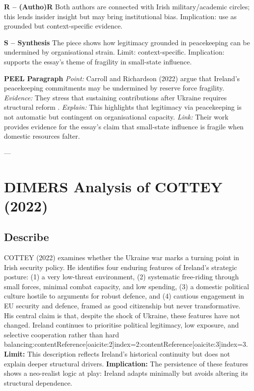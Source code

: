 \textbf{R – (Autho)R}  
Both authors are connected with Irish military/academic circles; this lends insider insight but may bring institutional bias. Implication: use as grounded but context-specific evidence.

\textbf{S – Synthesis}  
The piece shows how legitimacy grounded in peacekeeping can be undermined by organisational strain. Limit: context-specific. Implication: supports the essay’s theme of fragility in small-state influence.

\textbf{PEEL Paragraph}  
\textit{Point:} Carroll and Richardson (2022) argue that Ireland’s peacekeeping commitments may be undermined by reserve force fragility.  
\textit{Evidence:} They stress that sustaining contributions after Ukraine requires structural reform \parencite{CARROLL_RICHARDSON_2022}.  
\textit{Explain:} This highlights that legitimacy via peacekeeping is not automatic but contingent on organisational capacity.  
\textit{Link:} Their work provides evidence for the essay’s claim that small-state influence is fragile when domestic resources falter.  

---
\section*{DIMERS Analysis of COTTEY (2022)}

\subsection*{Describe}
COTTEY (2022) \nocite{COTTEY_2022} examines whether the Ukraine war marks a turning point in Irish security policy. He identifies four enduring features of Ireland’s strategic posture: (1) a very low-threat environment, (2) systematic free-riding through small forces, minimal combat capacity, and low spending, (3) a domestic political culture hostile to arguments for robust defence, and (4) cautious engagement in EU security and defence, framed as good citizenship but never transformative. His central claim is that, despite the shock of Ukraine, these features have not changed. Ireland continues to prioritise political legitimacy, low exposure, and selective cooperation rather than hard balancing:contentReference[oaicite:2]{index=2}:contentReference[oaicite:3]{index=3}.  
\textbf{Limit:} This description reflects Ireland’s historical continuity but does not explain deeper structural drivers.  
\textbf{Implication:} The persistence of these features shows a neo-realist logic at play: Ireland adapts minimally but avoids altering its structural dependence.

